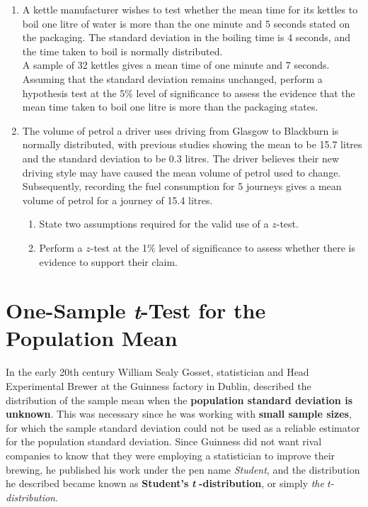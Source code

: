 \documentclass[
  11pt,
]{book}
\begin{document}
\begin{enumerate}[resume]
    \item A kettle manufacturer wishes to test whether the mean time for its kettles to boil one litre of water is more than the one minute and 5 seconds stated on the packaging. The standard deviation in the boiling time is 4 seconds, and the time taken to boil is normally distributed.\\[0.5em] A sample of 32 kettles gives a mean time of one minute and 7 seconds.\\[0.5em] Assuming that the standard deviation remains unchanged, perform a hypothesis test at the 5\% level of significance to assess the evidence that the mean time taken to boil one litre is more than the packaging states.
    \item The volume of petrol a driver uses driving from Glasgow to Blackburn is normally distributed, with previous studies showing the mean to be 15.7 litres and the standard deviation to be 0.3 litres. The driver believes their new driving style may have caused the mean volume of petrol used to change. Subsequently, recording the fuel consumption for 5 journeys gives a mean volume of petrol for a journey of 15.4 litres.
    \begin{enumerate}
        \item State two assumptions required for the valid use of a $z$-test.
        \item Perform a $z$-test at the 1\% level of significance to assess whether there is evidence to support their claim. 
    \end{enumerate}
\end{enumerate}

\pagebreak

\section{\texorpdfstring{One-Sample \textit{t}-Test for the Population Mean}{One-Sample -Test for the Population Mean}}\label{one-sample--test-for-the-population-mean}

In the early 20th century William Sealy Gosset, statistician and Head Experimental Brewer at the Guinness factory in Dublin, described the distribution of the sample mean when the \textbf{population standard deviation is unknown}. This was necessary since he was working with \textbf{small sample sizes}, for which the sample standard deviation could not be used as a reliable estimator for the population standard deviation. Since Guinness did not want rival companies to know that they were employing a statistician to improve their brewing, he published his work under the pen name \emph{Student}, and the distribution he described became known as \textbf{Student's} \textbf{\emph{t}} \textbf{-distribution}, or simply \emph{the} \(t\)-\emph{distribution}.
\end{document}
